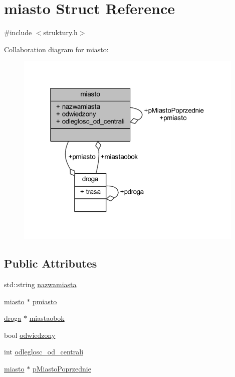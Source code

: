 \hypertarget{structmiasto}{}\section{miasto Struct Reference}
\label{structmiasto}


{\ttfamily \#include $<$struktury.\+h$>$}



Collaboration diagram for miasto\+:
\nopagebreak
\begin{figure}[H]
\begin{center}
\leavevmode
\includegraphics[width=310pt]{structmiasto__coll__graph}
\end{center}
\end{figure}
\subsection*{Public Attributes}
\begin{DoxyCompactItemize}
\item 
std\+::string \mbox{\hyperlink{structmiasto_a75a023beb08b889860c2068ffd47318e}{nazwamiasta}}
\item 
\mbox{\hyperlink{structmiasto}{miasto}} $\ast$ \mbox{\hyperlink{structmiasto_a9cd7b8d4e3e00ba833d3149b76a918f9}{pmiasto}}
\item 
\mbox{\hyperlink{structdroga}{droga}} $\ast$ \mbox{\hyperlink{structmiasto_af69437beea5c134e233947df273a48a4}{miastaobok}}
\item 
bool \mbox{\hyperlink{structmiasto_a7a2028174edb36e184c06d084d02ef27}{odwiedzony}}
\item 
int \mbox{\hyperlink{structmiasto_a0c3b5abe9b7ab0df2ceb80f9bd3faec3}{odleglosc\+\_\+od\+\_\+centrali}}
\item 
\mbox{\hyperlink{structmiasto}{miasto}} $\ast$ \mbox{\hyperlink{structmiasto_a8238eaa6785b35e180170ae00996e515}{p\+Miasto\+Poprzednie}}
\end{DoxyCompactItemize}


